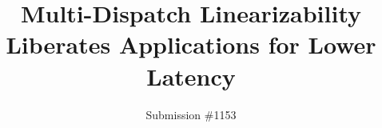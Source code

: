 \documentclass[letterpaper,twocolumn,10pt]{article}
\begin{document}


\date{\vspace{-5ex}}
\setlength{\droptitle}{-3em}

\title{\Large \bf Multi-Dispatch Linearizability Liberates Applications for Lower Latency\vspace{-2ex}}

\author{
{\rm Submission \#1153}
} %

\maketitle






















\clearpage
\appendix







\end{document}

